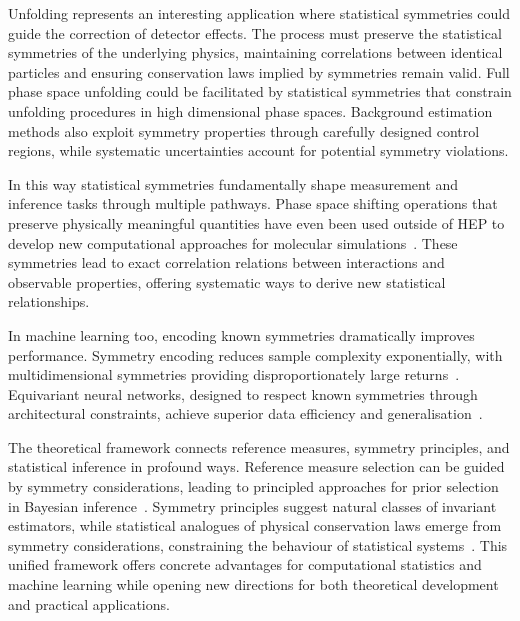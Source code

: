         Unfolding represents an interesting application where statistical symmetries could guide the correction of detector effects.
        The process must preserve the statistical symmetries of the underlying physics, maintaining correlations between identical particles and ensuring conservation laws implied by symmetries remain valid.
        Full phase space unfolding could be facilitated by statistical symmetries that constrain unfolding procedures in high dimensional phase spaces.
        Background estimation methods also exploit symmetry properties through carefully designed control regions, while systematic uncertainties account for potential symmetry violations.

        In this way statistical symmetries fundamentally shape measurement and inference tasks through multiple pathways.
        Phase space shifting operations that preserve physically meaningful quantities have even been used outside of HEP to develop new computational approaches for molecular simulations~\cite{hermann_noethers_2021}.
        These symmetries lead to exact correlation relations between interactions and observable properties, offering systematic ways to derive new statistical relationships.
        
        In machine learning too, encoding known symmetries dramatically improves performance.
        Symmetry encoding reduces sample complexity exponentially, with multidimensional symmetries providing disproportionately large returns~\cite{tahmasebi_exact_2023}.
        Equivariant neural networks, designed to respect known symmetries through architectural constraints, achieve superior data efficiency and generalisation~\cite{basheer_current_2024}.

        The theoretical framework connects reference measures, symmetry principles, and statistical inference in profound ways.
        Reference measure selection can be guided by symmetry considerations, leading to principled approaches for prior selection in Bayesian inference~\cite{kolmogorov_theorie_1957}.
        Symmetry principles suggest natural classes of invariant estimators, while statistical analogues of physical conservation laws emerge from symmetry considerations, constraining the behaviour of statistical systems~\cite{Gross:1996avf}.
        This unified framework offers concrete advantages for computational statistics and machine learning while opening new directions for both theoretical development and practical applications.

